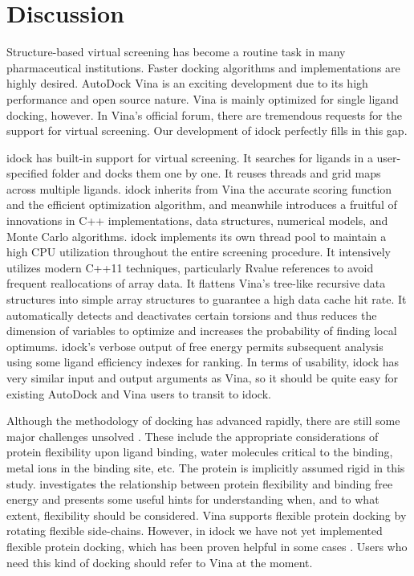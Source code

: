 \section{Discussion}

Structure-based virtual screening has become a routine task in many pharmaceutical institutions. Faster docking algorithms and implementations are highly desired. AutoDock Vina \citep{595} is an exciting development due to its high performance and open source nature. Vina is mainly optimized for single ligand docking, however. In Vina's official forum, there are tremendous requests for the support for virtual screening. Our development of idock perfectly fills in this gap.

idock has built-in support for virtual screening. It searches for ligands in a user-specified folder and docks them one by one. It reuses threads and grid maps across multiple ligands. idock inherits from Vina the accurate scoring function and the efficient optimization algorithm, and meanwhile introduces a fruitful of innovations in C++ implementations, data structures, numerical models, and Monte Carlo algorithms. idock implements its own thread pool to maintain a high CPU utilization throughout the entire screening procedure. It intensively utilizes modern C++11 techniques, particularly Rvalue references to avoid frequent reallocations of array data. It flattens Vina's tree-like recursive data structures into simple array structures to guarantee a high data cache hit rate. It automatically detects and deactivates certain torsions and thus reduces the dimension of variables to optimize and increases the probability of finding local optimums. idock's verbose output of free energy permits subsequent analysis using some ligand efficiency indexes \citep{337,336,335} for ranking. In terms of usability, idock has very similar input and output arguments as Vina, so it should be quite easy for existing AutoDock and Vina users to transit to idock.

Although the methodology of docking has advanced rapidly, there are still some major challenges unsolved \citep{493}. These include the appropriate considerations of protein flexibility upon ligand binding, water molecules critical to the binding, metal ions in the binding site, etc. The protein is implicitly assumed rigid in this study. \citep{1397} investigates the relationship between protein flexibility and binding free energy and presents some useful hints for understanding when, and to what extent, flexibility should be considered. Vina supports flexible protein docking by rotating flexible side-chains. However, in idock we have not yet implemented flexible protein docking, which has been proven helpful in some cases \citep{1084}. Users who need this kind of docking should refer to Vina at the moment.

